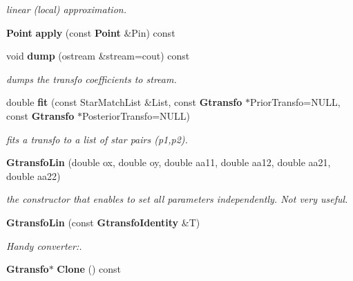 \begin{CompactItemize}
\begin{CompactList}\small\item\em linear (local) approximation.\item\end{CompactList}\item 
{}
{\bf Point} {\bf apply} (const {\bf Point} \&Pin) const\label{class_gtransfolin_a7}

\item 
{}
void {\bf dump} (ostream \&stream=cout) const\label{class_gtransfolin_a8}

\begin{CompactList}\small\item\em dumps the transfo coefficients to stream.\item\end{CompactList}\item 
double {\bf fit} (const Star\-Match\-List \&List, const {\bf Gtransfo} $\ast$Prior\-Transfo=NULL, const {\bf Gtransfo} $\ast$Posterior\-Transfo=NULL)
\begin{CompactList}\small\item\em fits a transfo to a list of star pairs (p1,p2).\item\end{CompactList}\item 
{}
{\bf Gtransfo\-Lin} (double ox, double oy, double aa11, double aa12, double aa21, double aa22)\label{class_gtransfolin_a10}

\begin{CompactList}\small\item\em the constructor that enables to set all parameters independently. Not very useful.\item\end{CompactList}\item 
{}
{\bf Gtransfo\-Lin} (const {\bf Gtransfo\-Identity} \&T)\label{class_gtransfolin_a11}

\begin{CompactList}\small\item\em Handy converter:.\item\end{CompactList}\item 
{}
{\bf Gtransfo}$\ast$ {\bf Clone} () const\label{class_gtransfolin_a12}


\end{CompactItemize}
